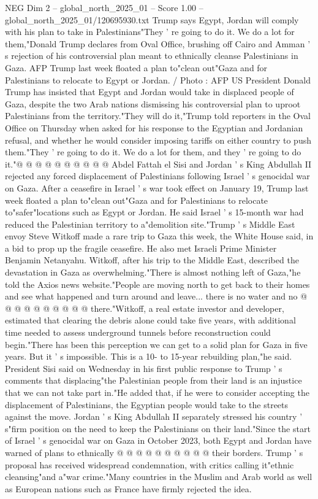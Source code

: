 \begin{textsample}{NEG Dim 2 – global\_north\_2025\_01 – Score 1.00 – global\_north\_2025\_01/120695930.txt}  \label{ex:f2_neg_052}
Trump says Egypt, Jordan will comply with his plan to take in Palestinians"They ' re going to do it.
We do a lot for them,"Donald Trump declares from Oval Office, brushing off Cairo and Amman ' s rejection of his controversial plan meant to ethnically cleanse Palestinians in Gaza.
AFP Trump last week floated a plan to"clean out"Gaza and for Palestinians to relocate to Egypt or Jordan. / Photo : AFP US President Donald Trump has insisted that Egypt and Jordan would take in displaced people of Gaza, despite the two Arab nations dismissing his controversial plan to uproot Palestinians from the territory."They will do it,"Trump told reporters in the Oval Office on Thursday when asked for his response to the Egyptian and Jordanian refusal, and whether he would consider imposing tariffs on either country to push them."They ' re going to do it.
We do a lot for them, and they ' re going to do it."@ @ @ @ @ @ @ @ @ @ Abdel Fattah el Sisi and Jordan ' s King Abdullah II rejected any forced displacement of Palestinians following Israel ' s genocidal war on Gaza.
After a ceasefire in Israel ' s war took effect on January 19, Trump last week floated a plan to"clean out"Gaza and for Palestinians to relocate to"safer"locations such as Egypt or Jordan.
He said Israel ' s 15-month war had reduced the Palestinian territory to a"demolition site."Trump ' s Middle East envoy Steve Witkoff made a rare trip to Gaza this week, the White House said, in a bid to prop up the fragile ceasefire.
He also met Israeli Prime Minister Benjamin Netanyahu.
Witkoff, after his trip to the Middle East, described the devastation in Gaza as overwhelming."There is almost nothing left of Gaza,"he told the Axios news website."People are moving north to get back to their homes and see what happened and turn around and leave... there is no water and no @ @ @ @ @ @ @ @ @ @ there."Witkoff, a real estate investor and developer, estimated that clearing the debris alone could take five years, with additional time needed to assess underground tunnels before reconstruction could begin."There has been this perception we can get to a solid plan for Gaza in five years.
But it ' s impossible.
This is a 10- to 15-year rebuilding plan,"he said.
President Sisi said on Wednesday in his first public response to Trump ' s comments that displacing"the Palestinian people from their land is an injustice that we can not take part in."He added that, if he were to consider accepting the displacement of Palestinians, the Egyptian people would take to the streets against the move.
Jordan ' s King Abdullah II separately stressed his country ' s"firm position on the need to keep the Palestinians on their land."Since the start of Israel ' s genocidal war on Gaza in October 2023, both Egypt and Jordan have warned of plans to ethnically @ @ @ @ @ @ @ @ @ @ their borders.
Trump ' s proposal has received widespread condemnation, with critics calling it"ethnic cleansing"and a"war crime."Many countries in the Muslim and Arab world as well as European nations such as France have firmly rejected the idea.

\end{textsample}
